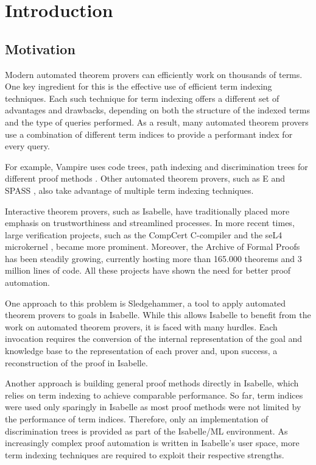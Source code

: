 \chapter{Introduction}\label{chapter:introduction}
\section{Motivation}
Modern automated theorem provers can efficiently work on thousands of terms.
One key ingredient for this is the effective use of efficient term indexing techniques.
Each such technique for term indexing offers a different set of advantages and drawbacks, depending on both the structure of the indexed terms and the type of queries performed. As a result, many automated theorem provers use a combination of different term indices to provide a performant index for every query.

For example, Vampire uses code trees, path indexing and discrimination trees for different proof methods \cite{riazanov_vampire_1999}. Other automated theorem provers, such as E \cite{schulz_system_2004} and SPASS \cite{weidenbach_spass_2009}, also take advantage of multiple term indexing techniques.

Interactive theorem provers, such as Isabelle, have traditionally placed more emphasis on trustworthiness and streamlined processes.
In more recent times, large verification projects, such as the CompCert C-compiler \cite{leroy_formally_2009} and the seL4 microkernel \cite{klein_sel4_2009}, became more prominent. Moreover, the Archive of Formal Proofs \cite{noauthor_archive_nodate} has been steadily growing, currently hosting more than 165.000 theorems and 3 million lines of code.
All these projects have shown the need for better proof automation.

One approach to this problem is Sledgehammer, a tool to apply automated theorem provers to goals in Isabelle. While this allows Isabelle to benefit from the work on automated theorem provers, it is faced with many hurdles. Each invocation requires the conversion of the internal representation of the goal and knowledge base to the representation of each prover and, upon success, a reconstruction of the proof in Isabelle. \cite{bohme_sledgehammer_2010,blanchette_more_2012}

Another approach is building general proof methods directly in Isabelle, which relies on term indexing to achieve comparable performance. So far, term indices were used only sparingly in Isabelle as most proof methods were not limited by the performance of term indices. Therefore, only an implementation of discrimination trees is provided as part of the Isabelle/ML environment. As increasingly complex proof automation is written in Isabelle's user space, more term indexing techniques are required to exploit their respective strengths.

